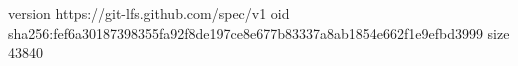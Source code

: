 version https://git-lfs.github.com/spec/v1
oid sha256:fef6a30187398355fa92f8de197ce8e677b83337a8ab1854e662f1e9efbd3999
size 43840
